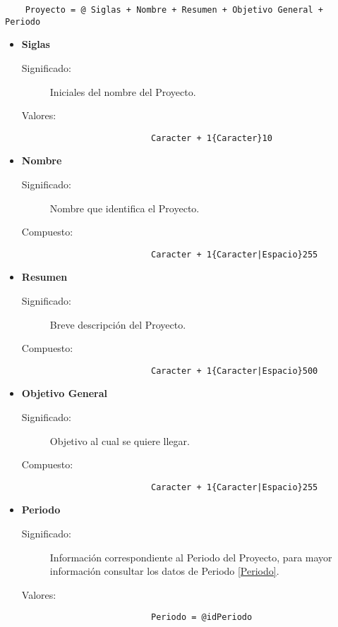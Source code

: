 \begin{lstlisting}
	Proyecto = @ Siglas + Nombre + Resumen + Objetivo General + Periodo
\end{lstlisting}
\begin{itemize}

	\item	\textbf{Siglas}
		\begin{description}
			\item[Significado:]Iniciales del nombre del Proyecto.
			\item[Valores:]{\begin{lstlisting}
					Caracter + 1{Caracter}10\end{lstlisting}}
		\end{description}

	\item	\textbf{Nombre}
		\begin{description}
			\item[Significado:]Nombre que identifica el Proyecto.
			\item[Compuesto:]{\begin{lstlisting}
					Caracter + 1{Caracter|Espacio}255\end{lstlisting}}
		\end{description}

	\item	\textbf{Resumen}
		\begin{description}
			\item[Significado:]Breve descripción del Proyecto.
			\item[Compuesto:]{\begin{lstlisting}
					Caracter + 1{Caracter|Espacio}500\end{lstlisting}}
		\end{description}

	\item	\textbf{Objetivo General}
		\begin{description}
			\item[Significado:]Objetivo al cual se quiere llegar.
			\item[Compuesto:]{\begin{lstlisting}
					Caracter + 1{Caracter|Espacio}255\end{lstlisting}}
		\end{description}

	\item	\textbf{Periodo}
		\begin{description}
			\item[Significado:]Información correspondiente al Periodo del Proyecto, para mayor información consultar los datos de Periodo \ref{Periodo}.
			\item[Valores:]{\begin{lstlisting}
					Periodo = @idPeriodo 
				\end{lstlisting}}
		\end{description}
\end{itemize}







